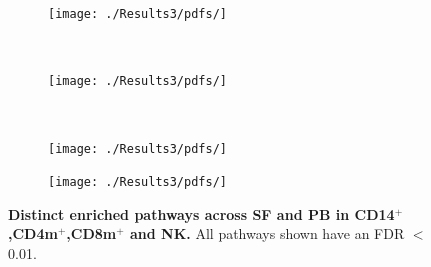 \begin{figure}[H]
\centering
\begin{subfigure}[b]{0.45\textwidth}
\centering 
\texttt{[image: ./Results3/pdfs/]}
\caption{}
\end{subfigure}
~
\begin{subfigure}[b]{0.45\textwidth}
\centering 
\texttt{[image: ./Results3/pdfs/]}
\caption{}
\end{subfigure}
~
\begin{subfigure}[b]{0.45\textwidth} 
\centering
\texttt{[image: ./Results3/pdfs/]}%
\caption{}
\end{subfigure}
\begin{subfigure}[b]{0.45\textwidth} 
\centering
\texttt{[image: ./Results3/pdfs/]}%
\caption{}
\end{subfigure}
\caption[Distinct enriched pathways across SF and PB in CD14$^+$,CD4m$^+$,CD8m$^+$ and NK.]{\textbf{Distinct enriched pathways across SF and PB in CD14$^+$,CD4m$^+$,CD8m$^+$ and NK.} All pathways shown have an FDR $<$0.01. }
\label{figure:PSA_ATAC_pathway_analysis_all_DOC}
\end{figure}




